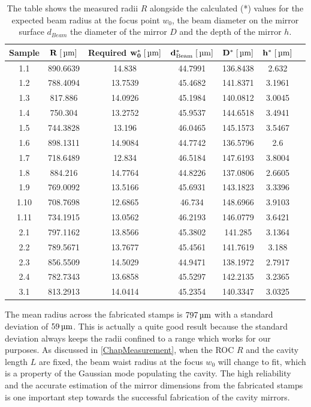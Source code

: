 \begin{table}[H]
	\begin{tabular}{ccccccc}
	\hline
\textbf{Sample} & \textbf{$\mathbf{R\;[\um]}$} & \textbf{Required $\mathbf{w_0^*\;[\um]}$} & \textbf{$\mathbf{d_{\si{Beam}}^*\;[\um]}$} & \textbf{$\mathbf{D^*\;[\um]}$} & \textbf{$\mathbf{h^*\;[\um]}$} \\
	\hline
	1.1 & 890.6639 & 14.838 & 44.7991 & 136.8438 & 2.632 \\
	1.2 & 788.4094 & 13.7539 & 45.4682 & 141.8371 & 3.1961 \\
	1.3 & 817.886 & 14.0926 & 45.1984 & 140.0812 & 3.0045 \\
	1.4 & 750.304 & 13.2752 & 45.9537 & 144.6518 & 3.4941 \\
	1.5 & 744.3828 & 13.196 & 46.0465 & 145.1573 & 3.5467 \\
	1.6 & 898.1311 & 14.9084 & 44.7742 & 136.5796 & 2.6 \\
	1.7 & 718.6489 & 12.834 & 46.5184 & 147.6193 & 3.8004 \\
	1.8 & 884.216 & 14.7764 & 44.8226 & 137.0806 & 2.6605 \\
	1.9 & 769.0092 & 13.5166 & 45.6931 & 143.1823 & 3.3396 \\
	1.10 & 708.7698 & 12.6865 & 46.734 & 148.6966 & 3.9103 \\
	1.11 & 734.1915 & 13.0562 & 46.2193 & 146.0779 & 3.6421 \\
	2.1 & 797.1162 & 13.8566 & 45.3802 & 141.285 & 3.1364 \\
	2.2 & 789.5671 & 13.7677 & 45.4561 & 141.7619 & 3.188 \\
	2.3 & 856.5509 & 14.5029 & 44.9471 & 138.1972 & 2.7917 \\
	2.4 & 782.7343 & 13.6858 & 45.5297 & 142.2135 & 3.2365 \\
	3.1 & 813.2913 & 14.0414 & 45.2354 & 140.3347 & 3.0325 \\
	\hline
\end{tabular}
	\caption{The table shows the measured radii $R$ alongside the calculated (*) values for the expected beam radius at the focus point $w_0$, the beam diameter on the mirror surface $d_{\si{Beam}}$ the diameter of the mirror $D$ and the depth of the mirror $h$.}
	\label{table:CalcMirrorData}
\end{table}
The mean radius across the fabricated stamps is $797\um$ with a standard deviation of $59\um$. This is actually a quite good result because the standard deviation always keeps the radii confined to a range which works for our purposes. As discussed in \autoref{ChapMeasurement}, when the ROC $R$ and the cavity length $L$ are fixed, the beam waist radius at the focus $w_0$ will change to fit, which is a property of the Gaussian mode populating the cavity. The high reliability and the accurate estimation of the mirror dimensions from the fabricated stamps is one important step towards the successful fabrication of the cavity mirrors.

